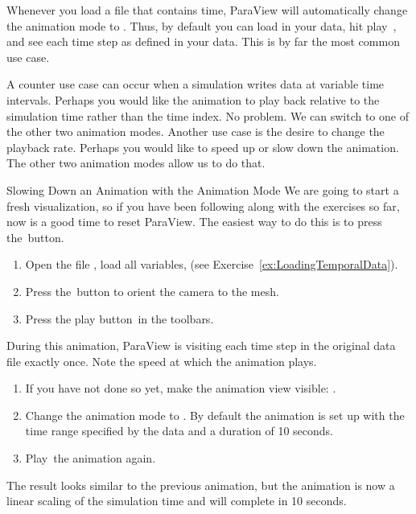 Whenever you load a file that contains time, ParaView will automatically
change the animation mode to .  Thus, by default you
can load in your data, hit play~\vcrPlay, and see each time step as defined
in your data.  This is by far the most common use case.

A counter use case can occur when a simulation writes data at variable time
intervals.  Perhaps you would like the animation to play back relative to
the simulation time rather than the time index.  No problem.  We can switch
to one of the other two animation modes.  Another use case is the desire to
change the playback rate.  Perhaps you would like to speed up or slow down
the animation.  The other two animation modes allow us to do that.

\begin{exercise}{Slowing Down an Animation with the Animation Mode}%
  \label{ex:SlowingDownAnAnimation}%
  We are going to start a fresh visualization, so if you have been
  following along with the exercises so far, now is a good time to reset
  ParaView.  The easiest way to do this is to press the~\disconnect button.

  \begin{enumerate}
  \item Open the file , load all variables, \apply (see
    Exercise~\ref{ex:LoadingTemporalData}).
  \item Press the~\yPlus button to orient the camera to the mesh.
  \item Press the play button~\vcrPlay in the toolbars.
    \savecounter
  \end{enumerate}

  During this animation, ParaView is visiting each time step in the
  original data file exactly once.  Note the speed at which the animation
  plays.

  \begin{enumerate}
    \restorecounter
  \item If you have not done so yet, make the animation view visible:
     \ra {}.
  \item Change the animation mode to .  By default the
    animation is set up with the time range specified by the data and a
    duration of 10 seconds.
  \item Play~\vcrPlay the animation again.
    \savecounter
  \end{enumerate}

  The result looks similar to the previous 
  animation, but the animation is now a linear scaling of the simulation
  time and will complete in 10 seconds.


\end{exercise}
